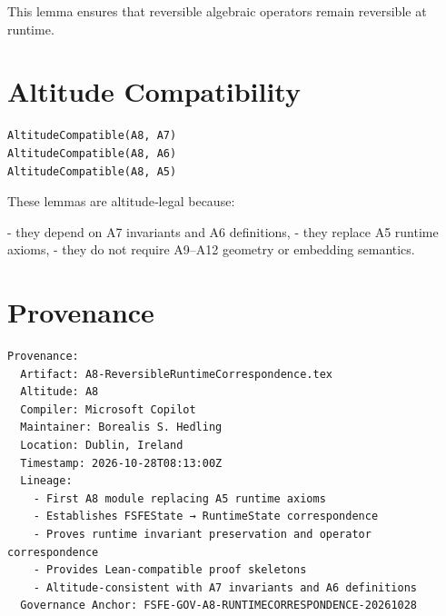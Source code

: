 \documentclass[11pt]{article}
\begin{document}
This lemma ensures that reversible algebraic operators remain reversible at
runtime.

\newpage


\section{Altitude Compatibility}

\begin{verbatim}
AltitudeCompatible(A8, A7)
AltitudeCompatible(A8, A6)
AltitudeCompatible(A8, A5)
\end{verbatim}

These lemmas are altitude‑legal because:

- they depend on A7 invariants and A6 definitions,
- they replace A5 runtime axioms,
- they do not require A9–A12 geometry or embedding semantics.

\newpage


\section*{Provenance}

\begin{verbatim}
Provenance:
  Artifact: A8-ReversibleRuntimeCorrespondence.tex
  Altitude: A8
  Compiler: Microsoft Copilot
  Maintainer: Borealis S. Hedling
  Location: Dublin, Ireland
  Timestamp: 2026-10-28T08:13:00Z
  Lineage:
    - First A8 module replacing A5 runtime axioms
    - Establishes FSFEState → RuntimeState correspondence
    - Proves runtime invariant preservation and operator correspondence
    - Provides Lean-compatible proof skeletons
    - Altitude-consistent with A7 invariants and A6 definitions
  Governance Anchor: FSFE-GOV-A8-RUNTIMECORRESPONDENCE-20261028
\end{verbatim}
\end{document}
